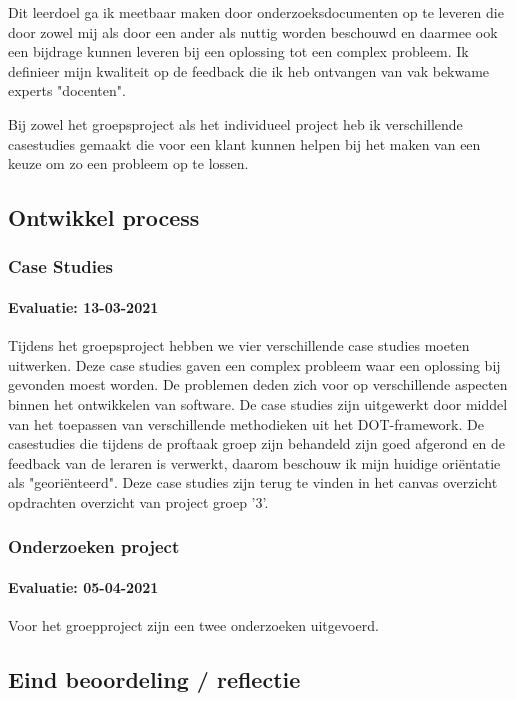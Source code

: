Dit leerdoel ga ik meetbaar maken door onderzoeksdocumenten op te leveren die door zowel mij als door een ander als
nuttig worden beschouwd en daarmee ook een bijdrage kunnen leveren bij een oplossing tot een complex probleem.
Ik definieer mijn kwaliteit op de feedback die ik heb ontvangen van vak bekwame experts "docenten".

Bij zowel het groepsproject als het individueel project heb ik verschillende casestudies gemaakt die voor een klant
kunnen helpen bij het maken van een keuze om zo een probleem op te lossen.

\bigskip
\subsection{Ontwikkel process}
\subsubsection{Case Studies}
\paragraph{Evaluatie: 13-03-2021}
Tijdens het groepsproject hebben we vier verschillende case studies moeten uitwerken.
Deze case studies gaven een complex probleem waar een oplossing bij gevonden moest worden.
De problemen deden zich voor op verschillende aspecten binnen het ontwikkelen van software.
De case studies zijn uitgewerkt door middel van het toepassen van verschillende methodieken uit het DOT-framework.
De casestudies die tijdens de proftaak groep zijn behandeld zijn goed afgerond en de feedback van de leraren is
verwerkt, daarom beschouw ik mijn huidige oriëntatie als "georiënteerd".
Deze case studies zijn terug te vinden in het canvas overzicht opdrachten overzicht van project groep '3'.

\subsubsection{Onderzoeken project}
\paragraph{Evaluatie: 05-04-2021}
Voor het groepproject zijn een twee onderzoeken uitgevoerd.

\subsection{Eind beoordeling / reflectie}


